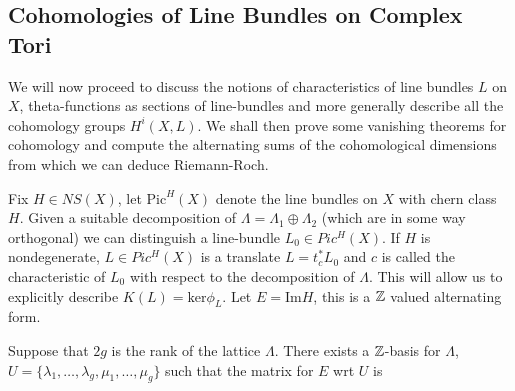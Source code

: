 \subsection{Cohomologies of Line Bundles on Complex Tori}
\begin{paragraph}
{} We will now proceed to discuss the notions of characteristics of line bundles $L$ on $X$, theta-functions as sections of line-bundles and more generally describe all the cohomology groups $H^i(X,L)$. We shall then prove some vanishing theorems for cohomology and compute the alternating sums of the cohomological dimensions from which we can deduce Riemann-Roch.
\end{paragraph}
\begin{paragraph}
{} Fix $H\in NS(X)$, let $\text{Pic}^H(X)$ denote the line bundles on $X$ with chern class $H$. Given a suitable decomposition of $\Lambda=\Lambda_1\oplus \Lambda_2$ (which are in some way orthogonal) we can distinguish a line-bundle $L_0\in Pic^H(X)$. If $H$ is nondegenerate, $L\in Pic^H(X)$ is a translate $L=t_c^* L_0$ and $c$ is called the characteristic of $L_0$ with respect to the decomposition of $\Lambda$. This will allow us to explicitly describe $K(L)=\text{ker} \phi_L$. Let $E=\text{Im} H$, this is a ${\mathbb Z}$ valued alternating form. 
\begin{lemma}
Suppose that $2g$ is the rank of the lattice $\Lambda$.
There exists a ${\mathbb Z}$-basis for $\Lambda$, 
$\mathit{U}=\{\lambda_1,\dots, \lambda_g, \mu_1,\dots, \mu_g \}$ such that the matrix for $E$ wrt $\mathit{U}$ is


\end{lemma}
\end{paragraph}
